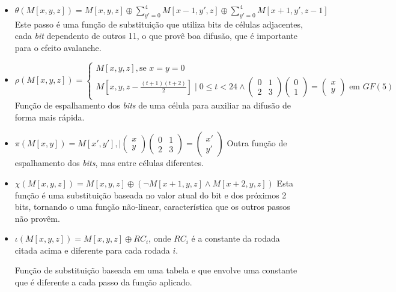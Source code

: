 \begin{itemize}
    \setlength\itemsep{1em}

    \item $\theta(M[x, y, z]) = M[x, y, z] \oplus \sum\limits_{y'=0}^{4}M[x-1, y', z] \oplus \sum\limits_{y'=0}^{4}M[x+1, y', z-1]$ \newline
        Este passo é uma função de substituição que utiliza bits de células
        adjacentes, cada \textit{bit} dependento de outros 11, o que provê boa
        difusão, que é importante para o efeito avalanche.

    \item $\rho(M[x, y, z]) = \begin{cases}
            M[x, y, z], \mbox{se } x=y=0 \\
            M[x, y, z - \frac{(t+1)(t+2)}{2}] \mid 0 \leq t < 24 \land \begin{pmatrix}0 & 1 \\ 2 & 3\end{pmatrix} \begin{pmatrix}0 \\ 1\end{pmatrix} = \begin{pmatrix}x \\ y\end{pmatrix}\mbox{ em } GF(5)
        \end{cases}$ \newline
        Função de espalhamento dos \textit{bits} de uma célula para auxiliar na
        difusão de forma mais rápida.

    \item $\pi(M[x, y]) = M[x', y'], \mid \begin{pmatrix}x \\ y\end{pmatrix}\begin{pmatrix}0 & 1 \\ 2 & 3\end{pmatrix} = \begin{pmatrix}x' \\ y'\end{pmatrix}$ \newline
        Outra função de espalhamento dos \textit{bits}, mas entre células
        diferentes.

    \item $\chi(M[x, y, z]) = M[x, y, z] \oplus (\neg{M}[x+1, y, z] \land M[x+2, y, z])$ \newline
        Esta função é uma substituição baseada no valor atual do bit e dos
        próximos 2 bits, tornando o \Keccak uma função não-linear,
        característica que os outros passos não provêm.

    \item $\iota(M[x, y, z]) = M[x, y, z] \oplus RC_{i}$, onde $RC_{i}$ é a
        constante da rodada citada acima e diferente para cada rodada $i$.

        Função de substituição baseada em uma tabela e que envolve uma
        constante que é diferente a cada passo da função aplicado.
\end{itemize}

